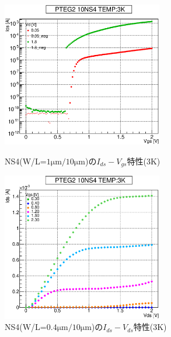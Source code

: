 				\begin{figure}[htbp]
					\begin{minipage}{0.5\hsize}
						\begin{center}
							\includegraphics[width=70mm]{./Chapter/Appendix/Picture/NST/NS4/PTEG2_10_NS4_IdVg_3K.eps}
						\end{center}
						\caption{NS4(W/L=$1\mathrm{\mu m}/10\mathrm{\mu m}$)の$I_{ds}-V_{gs}$特性(3K)}
						\label{fig:NS4_IdVg_3K}
					\end{minipage}
					\begin{minipage}{0.5\hsize}
						\begin{center}
							\includegraphics[width=70mm]{./Chapter/Appendix/Picture/NST/NS4/PTEG2_10_NS4_IdVd_3K.eps}
						\end{center}
						\caption{NS4(W/L=$0.4\mathrm{\mu m}/10\mathrm{\mu m}$)の$I_{ds}-V_{ds}$特性(3K)}
						\label{fig:NS4_IdVd_3K}
					\end{minipage}
				\end{figure}
